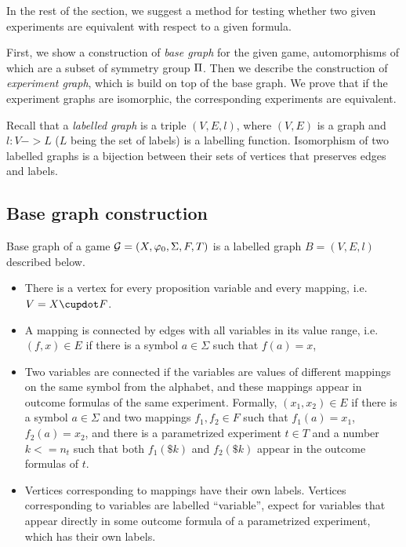In the rest of the section, we suggest a method for testing
  whether two given experiments are equivalent with respect to a given formula.

First, we show a construction of \emph{base graph} for the given game,
  automorphisms of which are a subset of symmetry group $\Pi$.
Then we describe the construction of \emph{experiment graph},
  which is build on top of the base graph.
  We prove
  that if the experiment graphs are isomorphic,
  the corresponding experiments are equivalent.

Recall that a \emph{labelled graph} is a triple $(V, E, l)$, where
  $(V, E)$ is a graph and $l: V->L$ ($L$ being the set of labels)
  is a labelling function.
Isomorphism of two labelled graphs is a bijection between their sets of vertices
that preserves edges and labels.

\subsection{Base graph construction}

Base graph of a game $\mathcal{G} = (X, \varphi_0, \Sigma, F, T)$ is a labelled graph $B = (V,E,l)$ described below.
\begin{itemize}
\item There is a vertex for every proposition variable and every mapping, i.e. $V = \Var \cupdot F$.
\item A mapping is connected by edges with all variables in its value range, i.e. $(f, x) \in E$ if there is a symbol $a\in\Sigma$ such that $f(a) = x$,
\item Two variables are connected if the variables are values
  of different mappings on the same symbol from the alphabet,
  and these mappings appear in outcome formulas of the same experiment.
  Formally, $(x_1, x_2) \in E$ if there is a symbol $a\in\Sigma$ and two mappings
  $f_1,f_2\in F$ such that $f_1(a) = x_1$, $f_2(a) = x_2$, and
  there is a parametrized experiment $t\in T$ and a number $k <= n_t$ such that
  both $f_1(\$k)$ and $f_2(\$k)$ appear in the outcome formulas of $t$.
\item
  Vertices corresponding to mappings have their own labels.
  Vertices corresponding to variables are labelled ``variable'',
  expect for variables that appear directly in some outcome formula
  of a parametrized experiment, which has their own labels.
\end{itemize}

